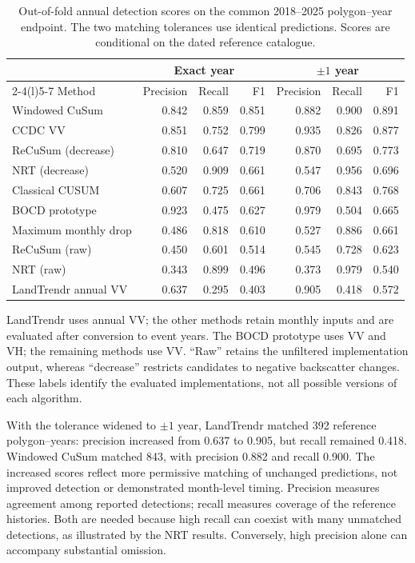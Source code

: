 \documentclass[11pt,a4paper]{article}
\begin{document}
\begin{table}[!htbp]
\caption{Out-of-fold annual detection scores on the common 2018--2025 polygon--year endpoint. The two matching tolerances use identical predictions. Scores are conditional on the dated reference catalogue.}
\label{tab:si_annual_scores}
\centering\small
\setlength{\tabcolsep}{4pt}
\begin{tabular*}{\linewidth}{@{\extracolsep{\fill}}lrrrrrr@{}}
\toprule
& \multicolumn{3}{c}{Exact year} & \multicolumn{3}{c}{$\pm1$ year}\\
\cmidrule(lr){2-4}\cmidrule(l){5-7}
Method & Precision & Recall & F1 & Precision & Recall & F1\\
\midrule
Windowed CuSum       & 0.842 & 0.859 & 0.851 & 0.882 & 0.900 & 0.891\\
CCDC VV              & 0.851 & 0.752 & 0.799 & 0.935 & 0.826 & 0.877\\
ReCuSum (decrease)   & 0.810 & 0.647 & 0.719 & 0.870 & 0.695 & 0.773\\
NRT (decrease)       & 0.520 & 0.909 & 0.661 & 0.547 & 0.956 & 0.696\\
Classical CUSUM      & 0.607 & 0.725 & 0.661 & 0.706 & 0.843 & 0.768\\
BOCD prototype      & 0.923 & 0.475 & 0.627 & 0.979 & 0.504 & 0.665\\
Maximum monthly drop & 0.486 & 0.818 & 0.610 & 0.527 & 0.886 & 0.661\\
ReCuSum (raw)        & 0.450 & 0.601 & 0.514 & 0.545 & 0.728 & 0.623\\
NRT (raw)            & 0.343 & 0.899 & 0.496 & 0.373 & 0.979 & 0.540\\
LandTrendr annual VV & 0.637 & 0.295 & 0.403 & 0.905 & 0.418 & 0.572\\
\bottomrule
\end{tabular*}
\par\smallskip
\raggedright\footnotesize
LandTrendr uses annual VV; the other methods retain monthly inputs and are evaluated after conversion to event years. The BOCD prototype uses VV and VH; the remaining methods use VV. ``Raw'' retains the unfiltered implementation output, whereas ``decrease'' restricts candidates to negative backscatter changes. These labels identify the evaluated implementations, not all possible versions of each algorithm.
\end{table}

With the tolerance widened to $\pm1$ year, LandTrendr matched 392 reference polygon--years: precision increased from 0.637 to 0.905, but recall remained 0.418. Windowed CuSum matched 843, with precision 0.882 and recall 0.900. The increased scores reflect more permissive matching of unchanged predictions, not improved detection or demonstrated month-level timing. Precision measures agreement among reported detections; recall measures coverage of the reference histories. Both are needed because high recall can coexist with many unmatched detections, as illustrated by the NRT results. Conversely, high precision alone can accompany substantial omission.
\end{document}
